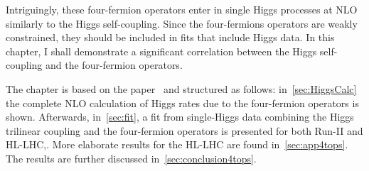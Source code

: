 \par Intriguingly, these four-fermion operators enter in single Higgs processes at NLO similarly to the Higgs self-coupling. Since the four-fermions operators are weakly constrained, they should be included in fits that include Higgs data. In this chapter, I shall demonstrate a significant correlation between the Higgs self-coupling and the four-fermion operators.
\par 
The chapter is based on the paper~\cite{Alasfar:2022zyr} and structured as follows: in~\autoref{sec:HiggsCalc} the complete NLO calculation of Higgs rates due to the four-fermion operators is shown. Afterwards, in~\autoref{sec:fit}, a fit from single-Higgs data combining the Higgs trilinear coupling and the four-fermion operators is presented for both Run-II and HL-LHC,. More elaborate results for the HL-LHC are found in~\autoref{sec:app4tops}. The results are further discussed in~\autoref{sec:conclusion4tops}.
